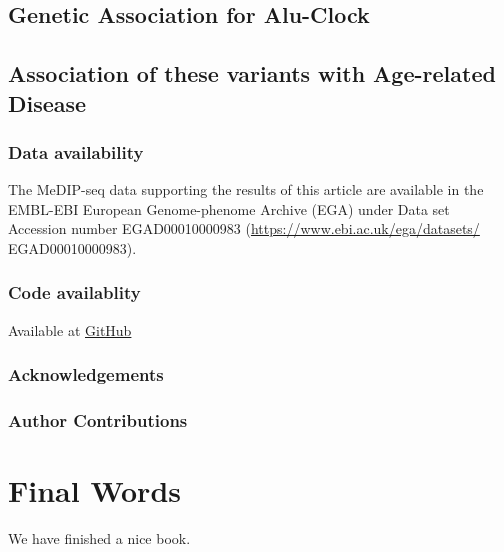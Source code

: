 \documentclass[]{book}
\begin{document}
\hypertarget{genetic-association-for-alu-clock}{%
\section{Genetic Association for Alu-Clock}\label{genetic-association-for-alu-clock}}

\hypertarget{association-of-these-variants-with-age-related-disease}{%
\section{Association of these variants with Age-related Disease}\label{association-of-these-variants-with-age-related-disease}}

\hypertarget{data-availability-1}{%
\subsection{Data availability}\label{data-availability-1}}

The MeDIP-seq data supporting the results of this article are available in the EMBL-EBI European Genome-phenome Archive (EGA) under Data set Accession number EGAD00010000983 (\url{https://www.ebi.ac.uk/ega/datasets/}
EGAD00010000983).

\hypertarget{code-availablity-1}{%
\subsection{Code availablity}\label{code-availablity-1}}

Available at \href{https://github.com/richardjacton}{GitHub}

\newpage

\hypertarget{acknowledgements-2}{%
\subsection{Acknowledgements}\label{acknowledgements-2}}

\hypertarget{author-contributions-1}{%
\subsection{Author Contributions}\label{author-contributions-1}}

\newpage

\hypertarget{final-words}{%
\chapter{Final Words}\label{final-words}}

We have finished a nice book.


\end{document}
